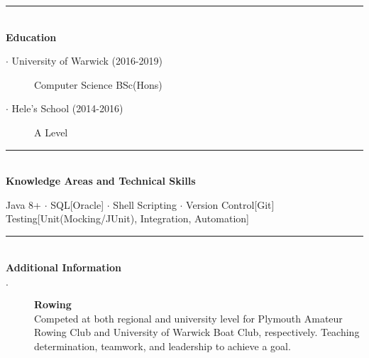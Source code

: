 \documentclass[12pt, a4paper]{article}
\begin{document}
    \noindent\rule{8cm}{0.4pt} \\
    \textbf{Education}
    \begin{description}
        \item[$\cdot$ University of Warwick (2016-2019)] Computer Science BSc(Hons)
        \item[$\cdot$ Hele's School (2014-2016)] A Level
    \end{description}

    \vspace{-2ex}
    \noindent\rule{8cm}{0.4pt} \\
    \textbf{Knowledge Areas and Technical Skills}
    \begin{description}
        Java 8+ $\cdot$
        SQL[Oracle] $\cdot$
        Shell Scripting $\cdot$
        Version Control[Git]
        \\Testing[Unit(Mocking/JUnit), Integration, Automation]
    \end{description}

    \vspace{-2ex}
    \noindent\rule{8cm}{0.4pt} \\
    \textbf{Additional Information}
    \begin{description}
        \item[$\cdot$] \textbf{Rowing} \\Competed at both regional and university level for Plymouth Amateur Rowing Club and University of Warwick Boat Club, respectively.
        Teaching determination, teamwork, and leadership to achieve a goal.
    \end{description}
\end{document}
